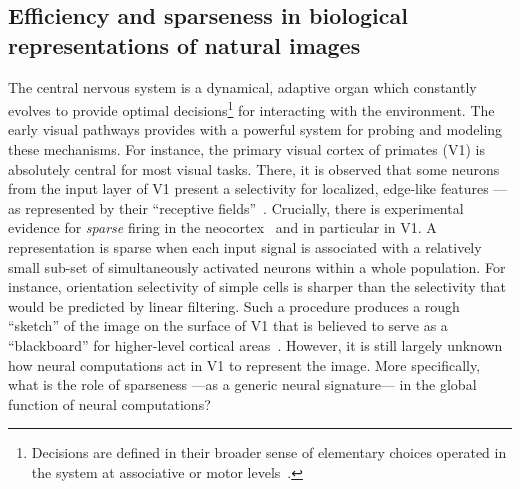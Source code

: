 \documentclass[a4paper, 11pt]{book}
\begin{document}
\subsection{Efficiency and sparseness in biological representations of natural images}

The central nervous system is a dynamical, adaptive organ
which constantly evolves to provide optimal decisions\footnote{Decisions are defined in their broader sense of elementary choices operated in the system at associative or motor levels~\citep{Friston12}.} for interacting with the environment.
The early visual pathways provides with a powerful system for probing and modeling these mechanisms.
For instance, the primary visual cortex of primates (V1) is absolutely central for most visual tasks.
There, it is observed that some neurons from the input layer of V1 present a selectivity for localized,
edge-like features ---as represented by their ``receptive fields''~\citep{Hubel68}.
Crucially, there is experimental evidence for \emph{sparse} firing in the neocortex~\citep{Barth12,Willmore11}
and in particular in V1.
A representation is sparse when each input signal is associated
with a relatively small sub-set of simultaneously activated neurons within a whole population.
For instance, orientation selectivity of simple cells is sharper
than the selectivity that would be predicted by linear filtering.
Such a procedure produces a rough ``sketch'' of the image
on the surface of V1 that is believed to serve as a ``blackboard''
for higher-level cortical areas~\citep{Marr83}.
However, it is still largely unknown how neural computations act in V1 to represent the image.
More specifically, what is the role of sparseness ---as a generic neural signature---
in the global function of neural computations?
\end{document}

